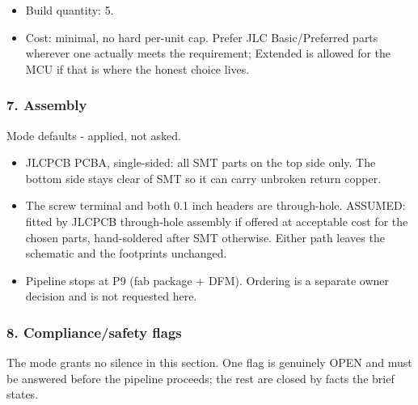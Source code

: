 \documentclass[11pt,a4paper]{article}
\begin{document}
\begin{itemize}
\item Build quantity: 5.
\item Cost: minimal, no hard per-unit cap. Prefer JLC Basic/Preferred parts
wherever one actually meets the requirement; Extended is allowed for the
MCU if that is where the honest choice lives.
\end{itemize}
\subsubsection*{7. Assembly}
Mode defaults - applied, not asked.

\begin{itemize}
\item JLCPCB PCBA, single-sided: all SMT parts on the top side only. The bottom
side stays clear of SMT so it can carry unbroken return copper.
\item The screw terminal and both 0.1 inch headers are through-hole. ASSUMED:
fitted by JLCPCB through-hole assembly if offered at acceptable cost for
the chosen parts, hand-soldered after SMT otherwise. Either path leaves the
schematic and the footprints unchanged.
\item Pipeline stops at P9 (fab package + DFM). Ordering is a separate owner
decision and is not requested here.
\end{itemize}
\subsubsection*{8. Compliance/safety flags}
The mode grants no silence in this section. One flag is genuinely OPEN and must be answered before the pipeline proceeds; the rest are closed by facts the brief states.
\end{document}
